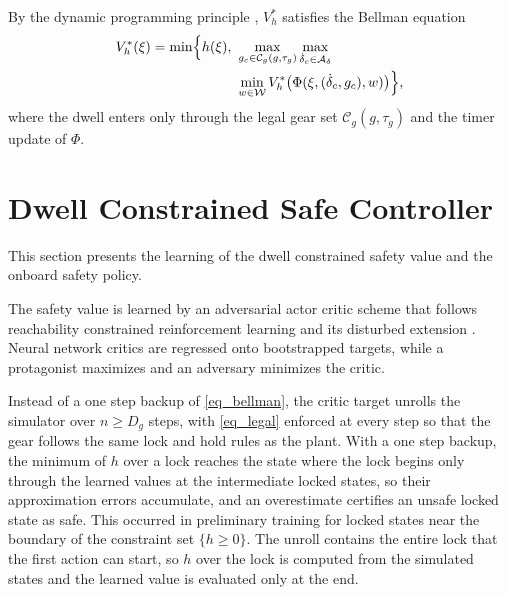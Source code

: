 \documentclass[lettersize,journal]{IEEEtran}
\newcommand{\calA}{\mathcal{A}}
\newcommand{\calC}{\mathcal{C}}
\newcommand{\calW}{\mathcal{W}}
\begin{document}
By the dynamic programming principle \cite{li2023cdc}, $V_h^{*}$ satisfies the Bellman equation
\begin{equation}
\begin{aligned}
V_h^{*}(\xi) = \min\Bigl\{ h(\xi),\ &\max_{g_c \in \calC_g(g, \tau_g)} \max_{\dot{\delta}_c \in \calA_\delta} \\
&\min_{w \in \calW} V_h^{*}\bigl(\Phi(\xi, (\dot{\delta}_c, g_c), w)\bigr) \Bigr\},
\end{aligned}
\label{eq_bellman}
\end{equation}
where the dwell enters only through the legal gear set $\calC_g(g, \tau_g)$ and the timer update of $\Phi$.

\section{Dwell Constrained Safe Controller}\label{sec_method}

This section presents the learning of the dwell constrained safety value and the onboard safety policy.

The safety value is learned by an adversarial actor critic scheme that follows reachability constrained reinforcement learning \cite{yu2022} and its disturbed extension \cite{li2023cdc}. Neural network critics are regressed onto bootstrapped targets, while a protagonist maximizes and an adversary minimizes the critic.

Instead of a one step backup of \eqref{eq_bellman}, the critic target unrolls the simulator over $n \ge D_g$ steps, with \eqref{eq_legal} enforced at every step so that the gear follows the same lock and hold rules as the plant. With a one step backup, the minimum of $h$ over a lock reaches the state where the lock begins only through the learned values at the intermediate locked states, so their approximation errors accumulate, and an overestimate certifies an unsafe locked state as safe. This occurred in preliminary training for locked states near the boundary of the constraint set $\{h \ge 0\}$. The unroll contains the entire lock that the first action can start, so $h$ over the lock is computed from the simulated states and the learned value is evaluated only at the end.
\end{document}
